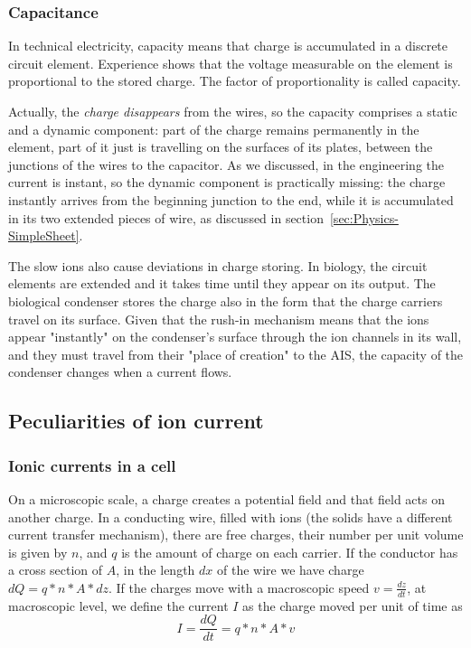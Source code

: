 \subsubsection[Capacitance]{Capacitance\label{sec:PHYSICS_CAPACITANCE}}

In technical electricity, capacity means that charge is accumulated in a discrete circuit element. Experience shows that the voltage measurable
on the element is proportional to the stored charge. The factor of proportionality is called capacity.

Actually, the \textit{charge disappears} from the wires, so the capacity comprises a static and a dynamic component:
part of the charge remains permanently in the element, part of it
just is travelling on the surfaces of its plates, between the 
junctions of the wires to the capacitor. 
As we discussed, in the engineering the current is instant, so
the  dynamic component is practically missing: the charge instantly arrives 
from the beginning junction to the end, while it is accumulated in its two extended pieces of wire, as discussed in section~\ref{sec:Physics-SimpleSheet}.

The slow ions also cause deviations in charge storing.
In biology, the circuit elements are extended and it takes time
until they appear on its output. The biological condenser stores
the charge also in the form that the charge carriers travel on its surface. Given that the rush-in mechanism means that the ions appear 
"instantly" on the condenser's surface through the ion channels in its wall, and they must travel from their "place of creation" to the \gls{AIS}, 
the capacity of the condenser changes when a current flows.

\subsection[Peculiarities]{Peculiarities of ion current
\label{sec:Physics-IonicPeculiarities}}
\subsubsection{Ionic currents in a cell\label{sec:IonicCurrent}}

On a microscopic scale, a charge creates a potential field
and that field acts on another charge. In a conducting wire, filled with ions (the solids have a different current transfer mechanism), there are free charges, their
number per unit volume is given by $n$, and $q$ is the amount of
charge on each carrier. If the conductor has a cross section of $A$,
in the length $dx$ of the wire we have charge $dQ=q*n*A*dz$. If the charges move with a macroscopic speed $v=\frac{dz}{dt}$, 
at macroscopic level, we define the current $I$ as the charge moved per unit of time as
\begin{equation}
I=\frac{dQ}{dt}=q*n*A*v\label{eq:DriftCurrent}
\end{equation}

